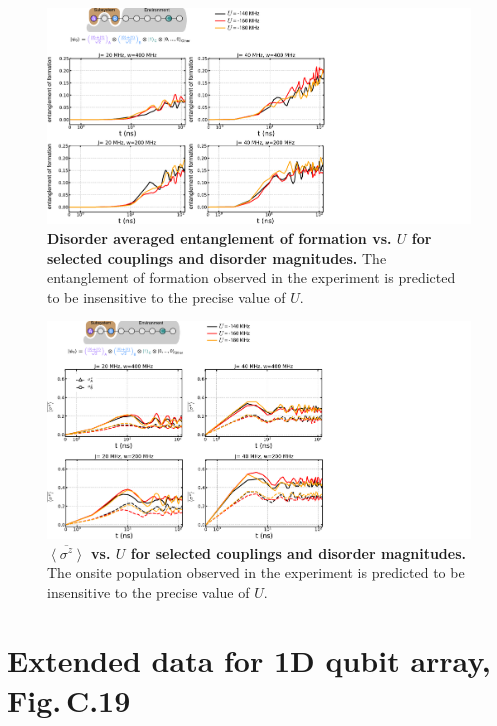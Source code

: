 \begin{figure}[tbh]
\centering
\hspace*{20 mm}
\includegraphics[width=200mm, keepaspectratio]{./PDF/eta_eof.pdf}
\caption{
\textbf{Disorder averaged entanglement of formation vs. $U$ for selected couplings and disorder magnitudes.}
The entanglement of formation observed in the experiment is predicted to be insensitive to the precise value of $U$.}
\end{figure}

\begin{figure}[h]
\centering
\hspace*{20 mm}
\includegraphics[width=200mm, keepaspectratio]{./PDF/eta_ziiz.pdf}
\caption{\textbf{$\overline{\left< \sigma^z \right>}$ vs. $U$ for selected couplings and disorder magnitudes.}
The onsite population observed in the experiment is predicted to be insensitive to the precise value of $U$.}

\end{figure}

\section{Extended data for 1D qubit array, Fig.\,C.19}
